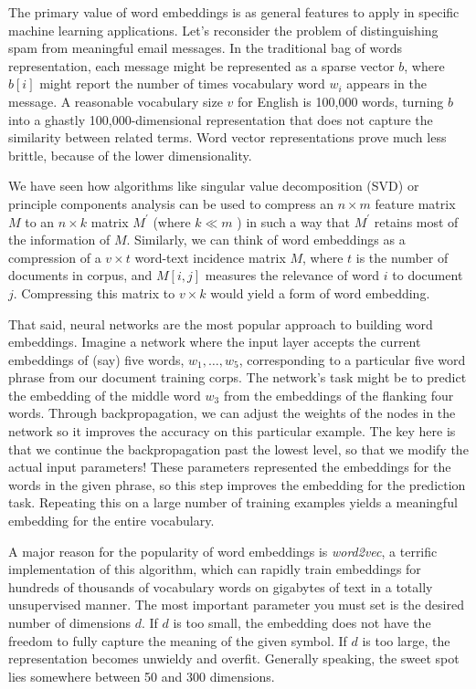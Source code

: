 \documentclass[10pt]{article}
\begin{document}
\begin{enumerate}
The primary value of word embeddings is as general features to apply in specific machine learning applications. Let's reconsider the problem of distinguishing spam from meaningful email messages. In the traditional bag of words representation, each message might be represented as a sparse vector $b$, where $b[i]$ might report the number of times vocabulary word $w_{i}$ appears in the message. A reasonable vocabulary size $v$ for English is 100,000 words, turning $b$ into a ghastly 100,000-dimensional representation that does not capture the similarity between related terms. Word vector representations prove much less brittle, because of the lower dimensionality.

We have seen how algorithms like singular value decomposition (SVD) or principle components analysis can be used to compress an $n \times m$ feature matrix $M$ to an $n \times k$ matrix $M^{\prime}$ (where $k \ll m$ ) in such a way that $M^{\prime}$ retains most of the information of $M$. Similarly, we can think of word embeddings as a compression of a $v \times t$ word-text incidence matrix $M$, where $t$ is the number of documents in corpus, and $M[i, j]$ measures the relevance of word $i$ to document $j$. Compressing this matrix to $v \times k$ would yield a form of word embedding.

That said, neural networks are the most popular approach to building word embeddings. Imagine a network where the input layer accepts the current embeddings of (say) five words, $w_{1}, \ldots, w_{5}$, corresponding to a particular five word phrase from our document training corps. The network's task might be to predict the embedding of the middle word $w_{3}$ from the embeddings of the flanking four words. Through backpropagation, we can adjust the weights of the nodes in the network so it improves the accuracy on this particular example. The key here is that we continue the backpropagation past the lowest level, so that we modify the actual input parameters! These parameters represented the embeddings for the words in the given phrase, so this step improves the embedding for the prediction task. Repeating this on a large number of training examples yields a meaningful embedding for the entire vocabulary.

A major reason for the popularity of word embeddings is \textit{word2vec}, a terrific implementation of this algorithm, which can rapidly train embeddings for hundreds of thousands of vocabulary words on gigabytes of text in a totally unsupervised manner. The most important parameter you must set is the desired number of dimensions $d$. If $d$ is too small, the embedding does not have the freedom to fully capture the meaning of the given symbol. If $d$ is too large, the representation becomes unwieldy and overfit. Generally speaking, the sweet spot lies somewhere between 50 and 300 dimensions.


\end{enumerate}
\end{document}
